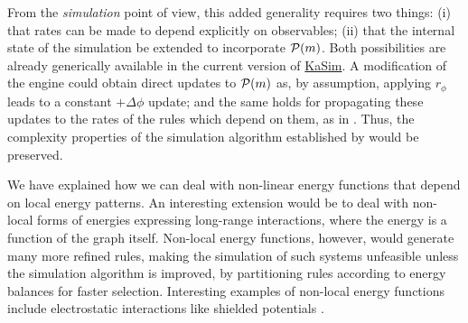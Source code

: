 From the \emph{simulation} point of view,
this added generality requires two things:
(i) that rates can be made to depend explicitly on observables;
(ii) that the internal state of the simulation
be extended to incorporate $\mathcal{P}(m)$.
Both possibilities are already generically available in
the current version of
\href{https://github.com/Kappa-Dev/KaSim}{KaSim}.
A modification of the engine could obtain
direct updates to $\mathcal{P}(m)$ as, by assumption,
applying $r_\phi$ leads to a constant $+\Delta\phi$ update;
and the same holds for propagating these updates
to the rates of the rules which depend on them,
\eg as in .
Thus, the complexity properties of the simulation algorithm
established by \citet{scalable} would be preserved.

We have explained how we can deal with non-linear energy functions
that depend on local energy patterns.
An interesting extension would be to deal with
non-local forms of energies expressing
long-range interactions,
where the energy is a function of the graph itself.
Non-local energy functions, however,
would generate many more refined rules,
making the simulation of such systems unfeasible
unless the simulation algorithm is improved,
\eg by partitioning rules according to energy balances
for faster selection.
Interesting examples of non-local energy functions
include electrostatic interactions
like shielded potentials \citep{kiselev}.



